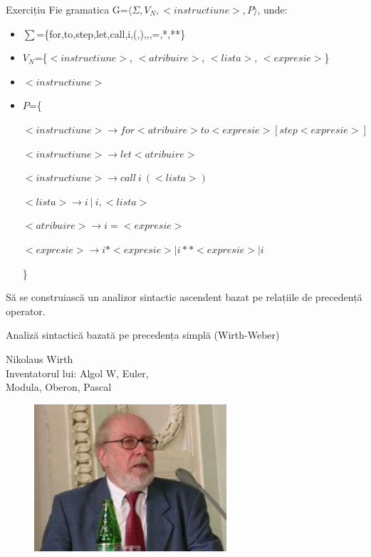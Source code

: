 \documentclass[pdf]{beamer}
\begin{document}
\begin{frame}{Exercițiu}
Fie gramatica G=$\langle \Sigma, V_N, <instructiune>, P \rangle$, unde:

\begin{itemize}
\item
$\sum$=\{for,to,step,let,call,i,(,),,,=,*,**\}
\item
$V_N$=\{$<instructiune>$, $<atribuire>$, $<lista>$, $<expresie>$\}
\item
$<instructiune>$
\item
$P$=\{

$<instructiune> \rightarrow for <atribuire> to <expresie> [ step <expresie> ]$

$<instructiune> \rightarrow let <atribuire>$

$<instructiune> \rightarrow call \ i \ (<lista>)$

$<lista> \rightarrow i \ | \ i, <lista>$

$<atribuire> \rightarrow i = <expresie>$

$<expresie> \rightarrow i * <expresie> | i** <expresie> | i$

\}
\end{itemize}
Să se construiască un analizor sintactic ascendent bazat pe relațiile de precedență operator.
\end{frame}






\begin{frame}{Analiză sintactică bazată pe precedența simplă (Wirth-Weber)}

\vfill
\begin{center}
Nikolaus Wirth\\
Inventatorul lui: Algol W, Euler,\\
Modula, Oberon, Pascal
\begin{figure}[b]
\includegraphics[scale=0.5]{img/Nikolaus.jpg}
\end{figure}
\end{center}
\end{frame}
\end{document}
